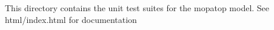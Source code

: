 This directory contains the unit test suites for the mopatop model. See html/index.\+html for documentation 